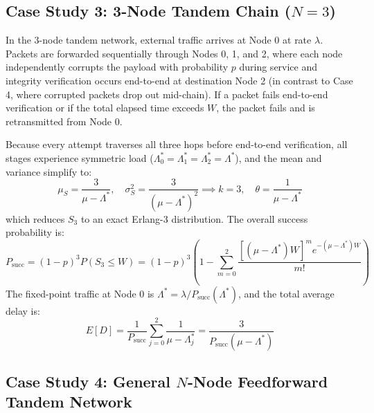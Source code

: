 \documentclass[12pt,onecolumn]{article}
\begin{document}
\subsection{Case Study 3: 3-Node Tandem Chain (\texorpdfstring{$N=3$}{N=3})}
In the 3-node tandem network, external traffic arrives at Node 0 at rate $\lambda$. Packets are forwarded sequentially through Nodes 0, 1, and 2, where each node independently corrupts the payload with probability $p$ during service and integrity verification occurs end-to-end at destination Node 2 (in contrast to Case 4, where corrupted packets drop out mid-chain). If a packet fails end-to-end verification or if the total elapsed time exceeds $W$, the packet fails and is retransmitted from Node 0.

Because every attempt traverses all three hops before end-to-end verification, all stages experience symmetric load ($\Lambda_0^* = \Lambda_1^* = \Lambda_2^* = \Lambda^*$), and the mean and variance simplify to:
\begin{equation}
\mu_S = \frac{3}{\mu - \Lambda^*}, \quad \sigma_S^2 = \frac{3}{(\mu - \Lambda^*)^2} \implies k = 3, \quad \theta = \frac{1}{\mu - \Lambda^*}
\end{equation}
which reduces $S_3$ to an exact Erlang-3 distribution. The overall success probability is:
\begin{equation}
P_{\text{succ}} = (1 - p)^3 P(S_3 \le W) = (1 - p)^3 \left(1 - \sum_{m=0}^2 \frac{[(\mu - \Lambda^*)W]^m e^{-(\mu - \Lambda^*)W}}{m!}\right)
\end{equation}
The fixed-point traffic at Node 0 is $\Lambda^* = \lambda / P_{\text{succ}}(\Lambda^*)$, and the total average delay is:
\begin{equation}
E[D] = \frac{1}{P_{\text{succ}}} \sum_{j=0}^2 \frac{1}{\mu - \Lambda_j^*} = \frac{3}{P_{\text{succ}}(\mu - \Lambda^*)}
\end{equation}

\subsection{Case Study 4: General \texorpdfstring{$N$}{N}-Node Feedforward Tandem Network}
\end{document}
